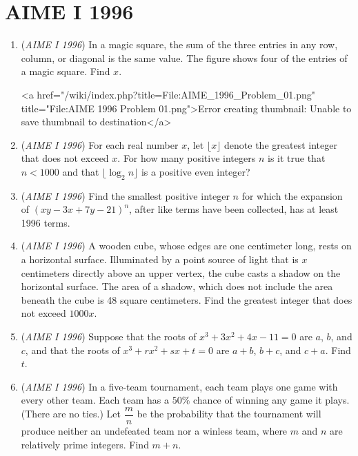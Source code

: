 \section{AIME I 1996}
        \begin{enumerate}
        	\item (\textit{AIME I 1996}) In a magic square, the sum of the three entries in any row, column, or diagonal is the same value. The figure shows four of the entries of a magic square. Find $x$. 


 <a href="/wiki/index.php?title=File:AIME\_1996\_Problem\_01.png" title="File:AIME 1996 Problem 01.png">Error creating thumbnail: Unable to save thumbnail to destination</a>


	\item (\textit{AIME I 1996}) For each real number $x$, let $\lfloor x \rfloor$ denote the greatest integer that does not exceed $x$. For how many positive integers $n$ is it true that $n<1000$ and that $\lfloor \log_{2} n \rfloor$ is a positive even integer?


 

	\item (\textit{AIME I 1996}) Find the smallest positive integer $n$ for which the expansion of $(xy-3x+7y-21)^n$, after like terms have been collected, has at least 1996 terms.


 

	\item (\textit{AIME I 1996}) A wooden cube, whose edges are one centimeter long, rests on a horizontal surface. Illuminated by a point source of light that is $x$ centimeters directly above an upper vertex, the cube casts a shadow on the horizontal surface. The area of a shadow, which does not include the area beneath the cube is 48 square centimeters. Find the greatest integer that does not exceed $1000x$.


 

	\item (\textit{AIME I 1996}) Suppose that the roots of $x^3+3x^2+4x-11=0$ are $a$, $b$, and $c$, and that the roots of $x^3+rx^2+sx+t=0$ are $a+b$, $b+c$, and $c+a$. Find $t$.


 

	\item (\textit{AIME I 1996}) In a five-team tournament, each team plays one game with every other team. Each team has a $50\%$ chance of winning any game it plays. (There are no ties.) Let $\dfrac{m}{n}$ be the probability that the tournament will produce neither an undefeated team nor a winless team, where $m$ and $n$ are relatively prime integers. Find $m+n$.



\end{enumerate}
